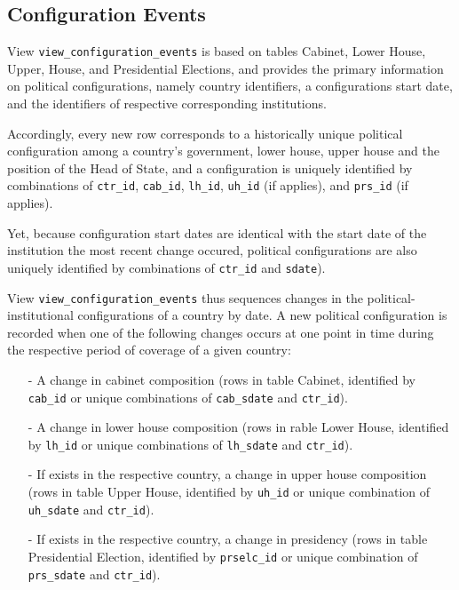 \subsection{Configuration Events}\label{subsec_view_configuration_events}
View \texttt{\footnotesize view\_configuration\_events} is based on tables Cabinet, Lower House, Upper, House, and Presidential Elections, and provides the primary information on political configurations, namely country identifiers, a configurations start date, and the identifiers of respective corresponding institutions.

Accordingly, every new row corresponds to a historically unique political configuration among a country's government, lower house, upper house and the position of the Head of State, and a configuration is uniquely identified by combinations of \texttt{\footnotesize ctr\_id}, \texttt{\footnotesize cab\_id}, \texttt{\footnotesize lh\_id}, \texttt{\footnotesize uh\_id} (if applies), and \texttt{\footnotesize prs\_id} (if applies).

Yet, because configuration start dates are identical with the start date of the institution the most recent change  occured, political configurations are also uniquely identified by combinations of \texttt{\footnotesize ctr\_id} and \texttt{\footnotesize sdate}).

View \texttt{\footnotesize view\_configuration\_events} thus sequences changes in the political-institutional configurations of a country by date.
A new political configuration is recorded when one of the following changes occurs at one point in time during the respective period of coverage of a given country:
\begin{itemize}\itemsep-4pt 
\item[-]{A change in cabinet composition (rows in table Cabinet, identified by \texttt{\footnotesize cab\_id} or unique combinations of \texttt{\footnotesize cab\_sdate} and \texttt{\footnotesize ctr\_id}).}
\item[-]{A change in lower house composition (rows in rable Lower House, identified by \texttt{\footnotesize lh\_id} or unique combinations of \texttt{\footnotesize lh\_sdate} and \texttt{\footnotesize ctr\_id}).}
\item[-]{If exists in the respective country, a change in upper house composition (rows in table Upper House, identified by \texttt{\footnotesize uh\_id} or unique combination of \texttt{\footnotesize uh\_sdate} and \texttt{\footnotesize ctr\_id}).}
\item[-]{If exists in the respective country, a change in presidency (rows in table Presidential Election, identified by \texttt{\footnotesize prselc\_id} or unique combination of \texttt{\footnotesize prs\_sdate} and \texttt{\footnotesize ctr\_id}).}
\end{itemize}

